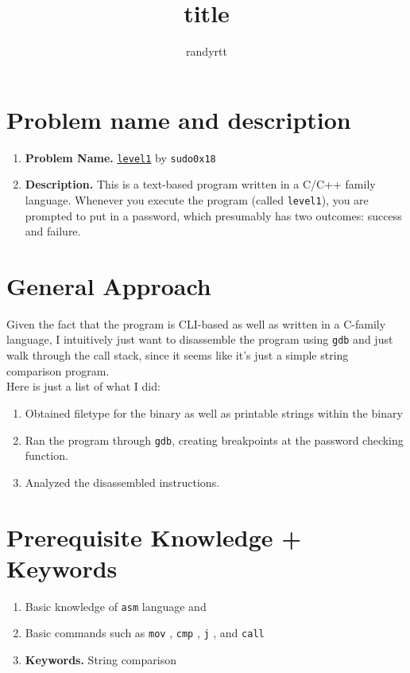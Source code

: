 \documentclass{report}
\title{title}
\author{randyrtt}
\begin{document}
\begin{sloppypar}
  \section{Problem name and description}%
  \label{sec:name}
  \begin{enumerate}
    \item \textbf{Problem Name.} \href{https://crackmes.one/crackme/646627a933c5d439389131d9}{\texttt{level1}} by \texttt{sudo0x18}
    \item \textbf{Description.} This is a text-based program written in a C/C++ family language. Whenever you execute the program (called \texttt{level1}), you are prompted to put in a password, which presumably has two outcomes: success and failure.
  \end{enumerate}

  \section{General Approach}%
  \label{sec:General Approach}
  Given the fact that the program is CLI-based as well as
  written in a C-family language, I intuitively just want to disassemble
  the program using \texttt{gdb} and just walk through the call stack, since
  it seems like it's just a simple string comparison program. \\
  Here is just a list of what I did:
  \begin{enumerate}
    \item Obtained filetype for the binary as well as printable strings
          within the binary
    \item Ran the program through \texttt{gdb}, creating breakpoints
          at the password checking function.
    \item Analyzed the disassembled instructions.
  \end{enumerate}


  \section{Prerequisite Knowledge + Keywords}%
  \label{sec:Prerequisite Knowledge}
  \begin{enumerate}
    \item Basic knowledge of \texttt{asm} language and
    \item Basic commands such as \texttt{mov} , \texttt{cmp} , \texttt{j} , and \texttt{call}

    \item \textbf{Keywords.} String comparison
  \end{enumerate}


\end{sloppypar}
\end{document}
